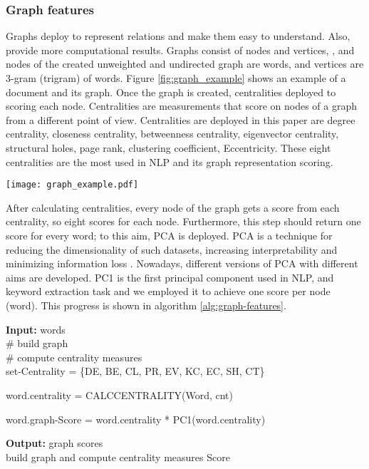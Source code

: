 \documentclass[3p]{elsarticle}
\begin{document}
\subsubsection{Graph features}
Graphs deploy to represent relations and make them easy to understand. Also, provide more computational results. Graphs consist of nodes and vertices, , and nodes of the created unweighted and undirected graph are words, and vertices are 3-gram (trigram) of words. Figure \ref{fig:graph_example} shows an example of a document and its graph. Once the graph is created, centralities deployed to scoring each node. Centralities are measurements that score on nodes of a graph from a different point of view. Centralities are deployed in this paper are degree centrality, closeness centrality, betweenness centrality, eigenvector centrality, structural holes, page rank, clustering coefficient, Eccentricity. These eight centralities are the most used in NLP and its graph representation scoring.




\begin{tcolorbox}
    \begin{minipage}{\textwidth}
        \centering
        \texttt{[image: graph\_example.pdf]}
        \label{fig:graph_example}
    \end{minipage}
\end{tcolorbox}


After calculating centralities, every node of the graph gets a score from each centrality, so eight scores for each node. Furthermore, this step should return one score for every word; to this aim, PCA is deployed. PCA is a technique for reducing the dimensionality of such datasets, increasing interpretability and minimizing information loss \cite{jolliffe_cadima_2016}. Nowadays, different versions of PCA with different aims are developed. PC1 is the first principal component used in NLP, and keyword extraction task \cite{vega2019multi} and we employed it to achieve one score per node (word). This progress is shown in algorithm \ref{alg:graph-features}.

\begin{algorithm}
 \SetAlgoLined
  \textbf{Input:} words \\
\# build graph\\
\# compute centrality measures\\
set-Centrality = \{DE, BE, CL, PR, EV, KC, EC, SH, CT\}

  {
     {

    word.centrality  =  CALCCENTRALITY(Word, cnt)
}

word.graph-Score = word.centrality * PC1(word.centrality)
}

 \textbf{Output:} graph scores \\
 
 \caption{build graph and compute centrality measures Score}
 \label{alg:graph-features}
 \end{algorithm}
\end{document}
